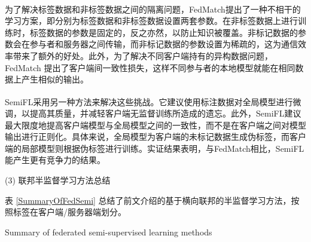 为了解决标签数据和非标签数据之间的隔离问题，FedMatch\textsuperscript{\cite{jeong2020federated}}提出了一种不相干的学习方案，即分别为标签数据和非标签数据设置两套参数。在非标签数据上进行训练时，标签数据的参数是固定的，反之亦然，以防止知识被覆盖。非标记数据的参数会在参与者和服务器之间传输，而非标记数据的参数设置为稀疏的，这为通信效率带来了额外的好处。此外，为了解决不同客户端持有的异构数据问题，FedMatch 提出了客户端间一致性损失，这样不同参与者的本地模型就能在相同数据上产生相似的输出。

SemiFL\textsuperscript{\cite{diao2022semifl}}采用另一种方法来解决这些挑战。它建议使用标注数据对全局模型进行微调，以提高其质量，并减轻客户端无监督训练所造成的遗忘。此外，SemiFL建议最大限度地提高客户端模型与全局模型之间的一致性，而不是在客户端之间对模型输出进行正则化。具体来说，全局模型为客户端的未标记数据生成伪标签，而客户端的局部模型则根据伪标签进行训练。实证结果表明，与FedMatch相比，SemiFL能产生更有竞争力的结果。

(3) 联邦半监督学习方法总结

表 \ref{SummaryOfFedSemi} 总结了前文介绍的基于横向联邦的半监督学习方法，按照标签在客户端/服务器端划分。

\vspace{-0.5cm}
\begin{table}[h]
	\centering
	{\songti \wuhao Summary of federated semi-supervised learning methods}
	\label{SummaryOfFedSemi}
\end{table}
\vspace{-0.35cm}

